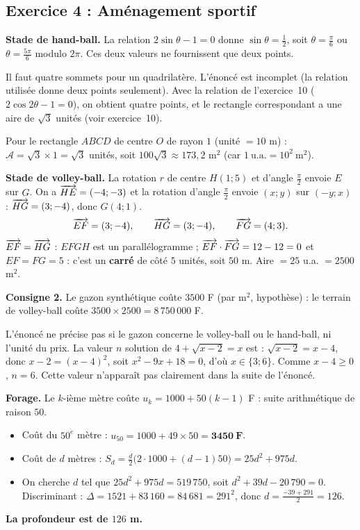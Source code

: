 \subsection{Exercice 4 : Am\'enagement sportif}

\textbf{Stade de hand-ball.} La relation $2\sin\theta-1=0$ donne $\sin\theta=\frac12$, soit
$\theta=\frac{\pi}{6}$ ou $\theta=\frac{5\pi}{6}$ modulo $2\pi$. Ces deux valeurs ne fournissent que deux points.
\begin{rem} Il faut quatre sommets pour un quadrilat\`ere. L'\'enonc\'e est incomplet (la relation utilis\'ee
donne deux points seulement). Avec la relation de l'exercice~10 ($2\cos2\theta-1=0$), on obtient quatre points,
et le rectangle correspondant a une aire de $\sqrt3$ unit\'es (voir exercice~10).
\end{rem}
Pour le rectangle $ABCD$ de centre $O$ de rayon $1$ (unit\'e $=10$ m) :
$\mathcal A=\sqrt3\times 1=\sqrt3$ unit\'es, soit $100\sqrt3\approx 173{,}2$ m$^2$ (car $1\ \text{u.a.}=10^2\ \text{m}^2$).

\textbf{Stade de volley-ball.} La rotation $r$ de centre $H(1;5)$ et d'angle $\frac{\pi}{2}$ envoie $E$ sur $G$.
On a $\overrightarrow{HE}=(-4;-3)$ et la rotation d'angle $\frac{\pi}{2}$ envoie $(x;y)$ sur $(-y;x)$ :
$\overrightarrow{HG}=(3;-4)$, donc $G(4;1)$.
\[
\overrightarrow{EF}=(3;-4),\qquad \overrightarrow{HG}=(3;-4),\qquad \overrightarrow{FG}=(4;3).
\]
$\overrightarrow{EF}=\overrightarrow{HG}$ : $EFGH$ est un parall\'elogramme ; $\overrightarrow{EF}\cdot\overrightarrow{FG}=12-12=0$ et $EF=FG=5$ :
c'est un \textbf{carr\'e} de c\^ot\'e $5$ unit\'es, soit $50$ m. Aire $=25$ u.a. $=2500$ m$^2$.

\medskip\noindent\textbf{Consigne 2.} Le gazon synthétique co\^ute $3500$ F (par m$^2$, hypoth\`ese) :
le terrain de volley-ball co\^ute $3500\times2500=8\,750\,000$ F.
\begin{rem} L'\'enonc\'e ne pr\'ecise pas si le gazon concerne le volley-ball ou le hand-ball, ni l'unit\'e du prix.
La valeur $n$ solution de $4+\sqrt{x-2}=x$ est : $\sqrt{x-2}=x-4$, donc $x-2=(x-4)^2$, soit $x^2-9x+18=0$, d'o\`u $x\in\{3;6\}$.
Comme $x-4\ge 0$, $n=6$. Cette valeur n'appara\^it pas clairement dans la suite de l'\'enonc\'e.\end{rem}

\medskip\noindent\textbf{Forage.} Le $k$-i\`eme m\`etre co\^ute $u_k=1000+50(k-1)$ F : suite arithm\'etique de raison $50$.
\begin{itemize}
  \item Co\^ut du $50^{\grave e}$ m\`etre : $u_{50}=1000+49\times50=\mathbf{3450\ F}$.
  \item Co\^ut de $d$ m\`etres : $\displaystyle S_d=\frac{d}{2}\bigl(2\cdot1000+(d-1)50\bigr)=25d^2+975d$.
  \item On cherche $d$ tel que $25d^2+975d=519\,750$, soit $d^2+39d-20\,790=0$.
  Discriminant : $\Delta=1521+83\,160=84\,681=291^2$, donc $d=\frac{-39+291}{2}=126$.
\end{itemize}
\textbf{La profondeur est de $126$ m.}

